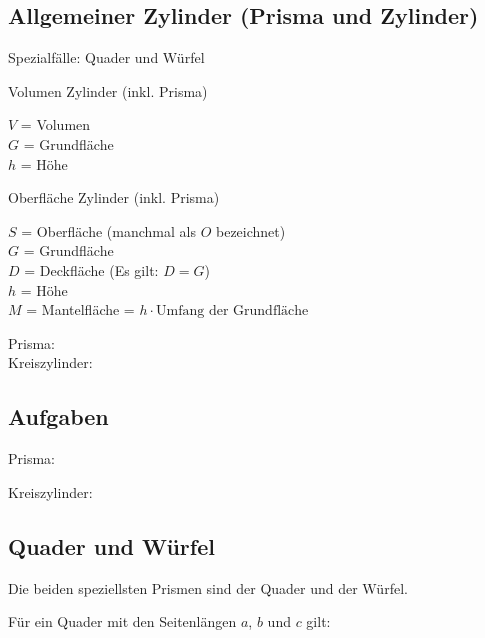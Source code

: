 \newpage
\subsection{Allgemeiner Zylinder (Prisma und Zylinder)}
Spezialfälle: Quader und Würfel

\begin{gesetz}{Volumen Zylinder (inkl. Prisma)}{}

  $V$ = Volumen\\
  $G$ = Grundfläche\\
  $h$ = Höhe\\
  \begin{center}\end{center}
\end{gesetz}

\begin{gesetz}{Oberfläche Zylinder (inkl. Prisma)}{}

  $S$ = Oberfläche (manchmal als $O$ bezeichnet)\\
  $G$ = Grundfläche\\
  $D$ = Deckfläche (Es gilt: $D=G$)\\
  $h$ = Höhe\\
  $M$ = Mantelfläche = $h \cdot{} \textrm{Umfang der Grundfläche}$\\
  \begin{center}\end{center}
\end{gesetz}

Prisma: \\
Kreiszylinder: 

\subsection*{Aufgaben}
Prisma:


Kreiszylinder:
\newpage
\subsection{Quader und Würfel}
Die beiden speziellsten Prismen sind der Quader und der Würfel.

Für ein Quader mit den Seitenlängen $a$, $b$ und $c$ gilt:

